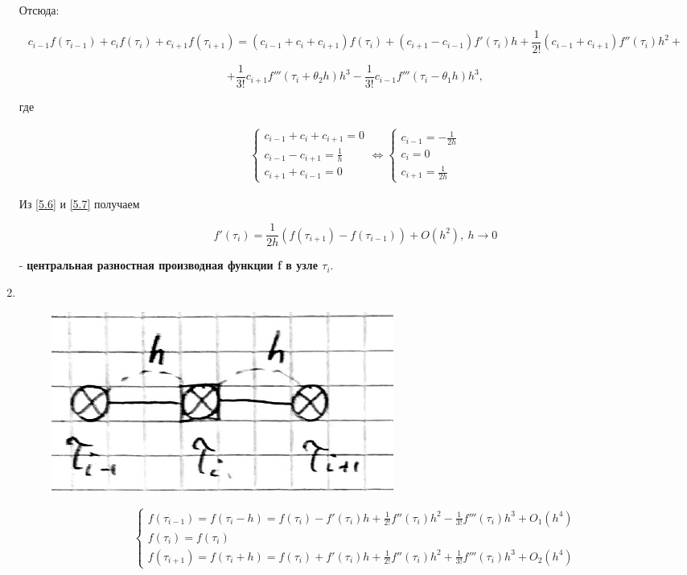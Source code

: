 \documentclass[__main__.tex]{subfiles}
\begin{document}
\begin{enumerate}
	Отсюда:
	
	$$
	c_{i-1} f\left( \tau_{i-1} \right) + c_i f\left( \tau_i \right) + c_{i+1} f \left( \tau_{i+1} \right) = \left( c_{i-1} + c_i + c_{i+1} \right) f \left( \tau_i \right) + \left( c_{i+1} - c_{i-1} \right) f'\left(\tau_i\right)h + \frac{1}{2!} \left(c_{i-1}+c_{i+1} \right) f''\left( \tau_i \right) h^2 +
	$$
	
	\begin{equation}\label{5.6}
	+ \frac{1}{3!} c_{i+1} f'''\left( \tau_i + \theta_2 h \right) h^3 - \frac{1}{3!}c_{i-1} f'''\left( \tau_i - \theta_1 h \right)h^3,
	\end{equation}
	
	где 
	
	\begin{gather}\label{5.7}
	\begin{cases}
	c_{i-1}+c_i+c_{i+1} = 0 \\
	c_{i-1} - c_{i+1} = \frac{1}{h}\\
	c_{i+1} + c_{i-1} = 0
	\end{cases}
	\Leftrightarrow
	\begin{cases}
	c_{i-1} = - \frac{1}{2h}\\
	c_i = 0 \\
	c_{i+1} = \frac{1}{2h}
	\end{cases}
	\end{gather}
	
	Из \ref{5.6} и \ref{5.7} получаем
	
	$$
	f'\left( \tau_i \right) = \frac{1}{2h} \left( f\left( \tau_{i+1} \right) - f \left( \tau_{i-1} \right) \right) + O \left(h^2\right), \ h\rightarrow 0
	$$
	
	 - \textbf{центральная разностная производная функции f в узле $\tau_i$}.
	 
	 \item $ $
	 
	 \begin{figure}[h!]
	 	\centering
	 	\includegraphics[width=0.05\linewidth]{img/img_5.5}
	 	\caption{}
	 	\label{img_5.5}
	 \end{figure}
	 
	 \begin{gather}
	 \begin{cases}
	 f\left( \tau_{i-1} \right) = f \left( \tau_i - h \right) = f \left( \tau_i \right) - f'\left(\tau_i\right)h + \frac{1}{2!} f''\left( \tau_i \right) h^2 - \frac{1}{3!} f'''\left( \tau_i \right) h^3 + O_1 \left(h^4\right)\\
	 f\left(\tau_i \right) = f\left(\tau_i \right) \\
	 f\left( \tau_{i+1} \right) = f \left( \tau_i + h \right) = f\left( \tau_i \right) + f'\left( \tau_i \right) h + \frac{1}{2!}f''\left( \tau_i \right) h^2 + \frac{1}{3!} f'''\left( \tau_i \right)h^3+ O_2 \left(h^4\right)
	 \end{cases}
	 \end{gather}
	

\end{enumerate}
\end{document}

